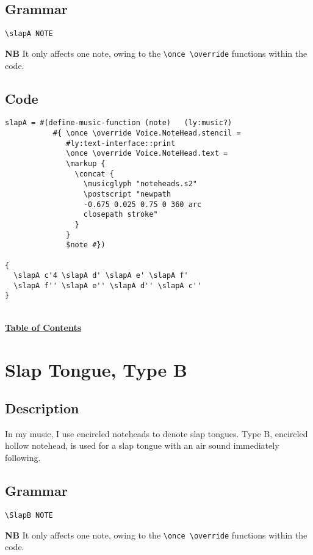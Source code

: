 \documentclass[11pt, oneside]{book}   	%
\begin{document}
\subsection{Grammar}
\begin{verbatim}
\slapA NOTE
\end{verbatim}
\textbf{NB} It only affects one note, owing to the \verb|\once \override| functions within the code.
\subsection{Code}
\begin{verbatim}
slapA = #(define-music-function (note)   (ly:music?)
           #{ \once \override Voice.NoteHead.stencil =
              #ly:text-interface::print
              \once \override Voice.NoteHead.text =
              \markup {
                \concat {
                  \musicglyph "noteheads.s2"
                  \postscript "newpath 
                  -0.675 0.025 0.75 0 360 arc 
                  closepath stroke"
                }
              }
              $note #})

{
  \slapA c'4 \slapA d' \slapA e' \slapA f'
  \slapA f'' \slapA e'' \slapA d'' \slapA c''
}
\end{verbatim}
\hyperref[sec:toc]{\\ \textbf{Table of Contents}}

\vfill \break


\section {Slap Tongue, Type B}
\hfill
\subsection{Description}
In my music, I use encircled noteheads to denote slap tongues. Type B, encircled hollow notehead, is used for a slap tongue with an air sound immediately following.  

\subsection{Grammar}
\begin{verbatim}
\SlapB NOTE
\end{verbatim}
\textbf{NB} It only affects one note, owing to the \verb|\once \override| functions within the code.
\end{document}
